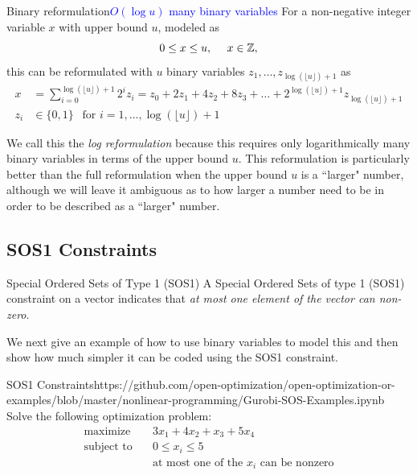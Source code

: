\begin{general}{Binary reformulation}{\textcolor{blue}{$O(\log u)$ many binary variables}}
\label{general:log-reformulation}
For a non-negative integer variable $x$ with upper bound $u$, modeled as 
\begin{equation}
0 \leq x \leq u, \ \ \ \ x \in {\mathbb{Z}},
\end{equation}
this can be reformulated with $u$ binary variables $z_1, \dots, z_{\log(\lfloor u \rfloor)+ 1}$ as 
\begin{equation}
\begin{split}
x & = \sum_{i=0}^{\log(\lfloor u \rfloor)+ 1}2^i z_i = z_0 + 2 z_1 +  4 z_2 + 8 z_3 + \dots + 2^{\log(\lfloor u \rfloor) + 1} z_{\log(\lfloor u \rfloor)+ 1}\\
z_i & \in \{0,1\} \ \ \text{ for } i=1, \dots, \log(\lfloor u \rfloor)+ 1
\end{split}
\end{equation}
\end{general}
We call this the \emph{log reformulation} because this requires only logarithmically many binary variables in terms of the upper bound $u$.   This reformulation is particularly better than the full reformulation when the upper bound $u$ is a ``larger" number, although we will leave it ambiguous as to how larger a number need to be in order to be described as a ``larger" number. 
\subsection{SOS1 Constraints}
\begin{definition}{Special Ordered Sets of Type 1 (SOS1)}
A Special Ordered Sets of type 1 (SOS1) constraint on a vector indicates that \emph{at most one element of the vector can non-zero}.
\end{definition}
We next give an example of how to use binary variables to model this and then show how much simpler it can be coded using the SOS1 constraint.

\begin{examplewithcode}{SOS1 Constraints}{https://github.com/open-optimization/open-optimization-or-examples/blob/master/nonlinear-programming/Gurobi-SOS-Examples.ipynb}
\label{example:sos1}
Solve the following optimization problem: \[\begin{aligned}
\text{maximize}\quad & 3x_1 + 4x_2 + x_3 + 5x_4 \\
\text{subject to}\quad & 0 \le x_i \le 5 \\
& \text{at most one of the $x_i$ can be nonzero}
\end{aligned}\]
\end{examplewithcode}
